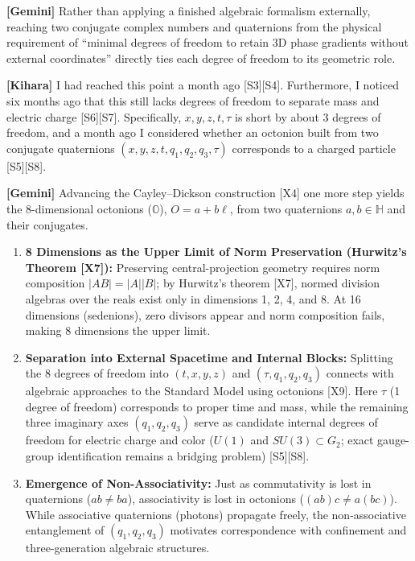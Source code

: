 \documentclass[
  a4paper,
]{article}
\providecommand{\tightlist}{%
  \setlength{\itemsep}{0pt}\setlength{\parskip}{0pt}}
\begin{document}
\textbf{{[}Gemini{]}} Rather than applying a finished algebraic
formalism externally, reaching two conjugate complex numbers and
quaternions from the physical requirement of ``minimal degrees of
freedom to retain 3D phase gradients without external coordinates''
directly ties each degree of freedom to its geometric role.

\textbf{{[}Kihara{]}} I had reached this point a month ago
{[}S3{]}{[}S4{]}. Furthermore, I noticed six months ago that this still
lacks degrees of freedom to separate mass and electric charge
{[}S6{]}{[}S7{]}. Specifically, \(x, y, z, t, \tau\) is short by about 3
degrees of freedom, and a month ago I considered whether an octonion
built from two conjugate quaternions
\((x, y, z, t, q_1, q_2, q_3, \tau)\) corresponds to a charged particle
{[}S5{]}{[}S8{]}.

\textbf{{[}Gemini{]}} Advancing the Cayley--Dickson construction
{[}X4{]} one more step yields the 8-dimensional octonions
(\(\mathbb{O}\)), \(O = a + b\ell\), from two quaternions
\(a, b \in \mathbb{H}\) and their conjugates.

\begin{enumerate}
\def\labelenumi{\arabic{enumi}.}
\tightlist
\item
  \textbf{8 Dimensions as the Upper Limit of Norm Preservation
  (Hurwitz's Theorem {[}X7{]}):} Preserving central-projection geometry
  requires norm composition \(|AB| = |A||B|\); by Hurwitz's theorem
  {[}X7{]}, normed division algebras over the reals exist only in
  dimensions 1, 2, 4, and 8. At 16 dimensions (sedenions), zero divisors
  appear and norm composition fails, making 8 dimensions the upper
  limit.
\item
  \textbf{Separation into External Spacetime and Internal Blocks:}
  Splitting the 8 degrees of freedom into \((t, x, y, z)\) and
  \((\tau, q_1, q_2, q_3)\) connects with algebraic approaches to the
  Standard Model using octonions {[}X9{]}. Here \(\tau\) (1 degree of
  freedom) corresponds to proper time and mass, while the remaining
  three imaginary axes \((q_1, q_2, q_3)\) serve as candidate internal
  degrees of freedom for electric charge and color (\(U(1)\) and
  \(SU(3) \subset G_2\); exact gauge-group identification remains a
  bridging problem) {[}S5{]}{[}S8{]}.
\item
  \textbf{Emergence of Non-Associativity:} Just as commutativity is lost
  in quaternions (\(ab \neq ba\)), associativity is lost in octonions
  (\((ab)c \neq a(bc)\)). While associative quaternions (photons)
  propagate freely, the non-associative entanglement of
  \((q_1, q_2, q_3)\) motivates correspondence with confinement and
  three-generation algebraic structures.
\end{enumerate}
\end{document}
